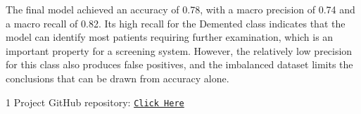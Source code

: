 \documentclass[10pt,twocolumn]{article}
\begin{document}
    The final model achieved an accuracy of 0.78, with a macro precision of 0.74 and a macro recall of 0.82. Its high recall for the Demented class indicates that the model can identify most patients requiring further examination, which is an important property for a screening system. However, the relatively low precision for this class also produces false positives, and the imbalanced dataset limits the conclusions that can be drawn from accuracy alone.

    \begin{thebibliography}{1}
        Project GitHub repository: \href{https://github.com/shock-rc/DS3010-Machine-Learning-Project}{\texttt{Click Here}}
    \end{thebibliography}
\end{document}
